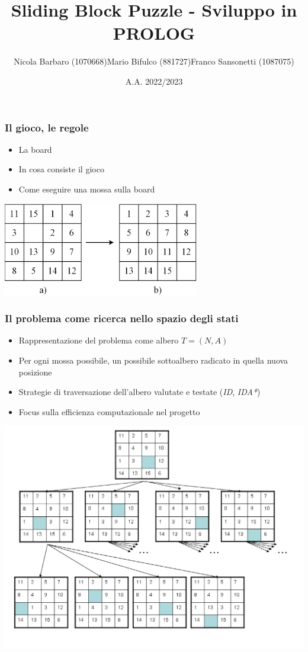 \documentclass[11pt]{beamer}
\author[Barbaro, Bifulco, Sansonetti]{\small Nicola Barbaro (1070668)\linebreak Mario Bifulco (881727)\linebreak Franco Sansonetti (1087075)}
\title{Sliding Block Puzzle - Sviluppo in PROLOG}
\date{A.A. 2022/2023}
\institute[]{Università degli studi di Torino\\Intelligenza Artificiale e Laboratorio}
\begin{document}
\begin{frame}
\titlepage
\end{frame}

\begin{frame}
\frametitle{Il gioco, le regole}
\begin{itemize}
    \item La board
    \item In cosa consiste il gioco
    \item Come eseguire una mossa sulla board
\end{itemize}
\includegraphics[scale=0.8]{scrambledtosolved.png}
\centering
\end{frame}

\begin{frame}
\frametitle{Il problema come ricerca nello spazio degli stati}
\begin{itemize}
    \item Rappresentazione del problema come albero $T  = (N, A)$
    \item Per ogni mossa possibile, un possibile sottoalbero radicato in quella nuova posizione
    \item Strategie di traversazione dell'albero valutate e testate  (\emph{ID}, \emph{IDA*})
    \item Focus sulla efficienza computazionale nel progetto
\end{itemize}
\includegraphics[scale=0.4]{tree.png}
\centering
\end{frame}
\end{document}
